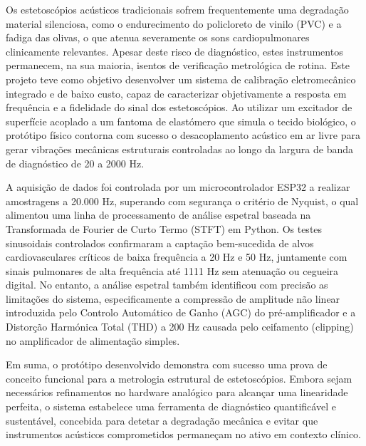 \begin{abstract}

\vspace*{10mm} 
\noindent
\textbf{\keywordslabel}: Stethoscope Calibration, Acoustic Transducer, Digital Signal Processing 

\end{abstract}
\begin{secondlangabstract}
Os estetoscópios acústicos tradicionais sofrem frequentemente uma degradação material silenciosa, como o endurecimento do policloreto de vinilo (PVC) e a fadiga das olivas, o que atenua severamente os sons cardiopulmonares clinicamente relevantes. Apesar deste risco de diagnóstico, estes instrumentos permanecem, na sua maioria, isentos de verificação metrológica de rotina. Este projeto teve como objetivo desenvolver um sistema de calibração eletromecânico integrado e de baixo custo, capaz de caracterizar objetivamente a resposta em frequência e a fidelidade do sinal dos estetoscópios. Ao utilizar um excitador de superfície acoplado a um fantoma de elastómero que simula o tecido biológico, o protótipo físico contorna com sucesso o desacoplamento acústico em ar livre para gerar vibrações mecânicas estruturais controladas ao longo da largura de banda de diagnóstico de 20 a 2000 Hz. 

A aquisição de dados foi controlada por um microcontrolador ESP32 a realizar amostragens a 20.000 Hz, superando com segurança o critério de Nyquist, o qual alimentou uma linha de processamento de análise espetral baseada na Transformada de Fourier de Curto Termo (STFT) em Python. Os testes sinusoidais controlados confirmaram a captação bem-sucedida de alvos cardiovasculares críticos de baixa frequência a 20 Hz e 50 Hz, juntamente com sinais pulmonares de alta frequência até 1111 Hz sem atenuação ou cegueira digital. No entanto, a análise espetral também identificou com precisão as limitações do sistema, especificamente a compressão de amplitude não linear introduzida pelo Controlo Automático de Ganho (AGC) do pré-amplificador e a Distorção Harmónica Total (THD) a 200 Hz causada pelo ceifamento (clipping) no amplificador de alimentação simples. 

Em suma, o protótipo desenvolvido demonstra com sucesso uma prova de conceito funcional para a metrologia estrutural de estetoscópios. Embora sejam necessários refinamentos no hardware analógico para alcançar uma linearidade perfeita, o sistema estabelece uma ferramenta de diagnóstico quantificável e sustentável, concebida para detetar a degradação mecânica e evitar que instrumentos acústicos comprometidos permaneçam no ativo em contexto clínico.



\end{secondlangabstract}
